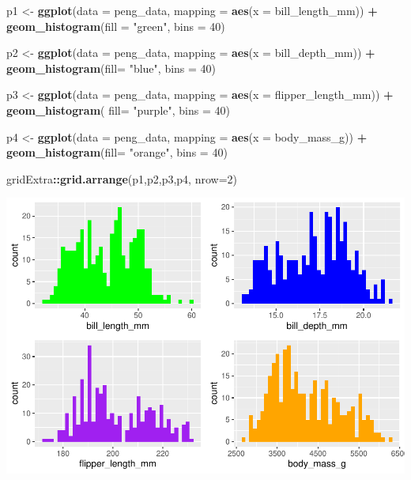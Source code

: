 \documentclass[
]{article}
\newenvironment{Shaded}{\begin{snugshade}}{\end{snugshade}}
\newcommand{\AttributeTok}[1]{\textcolor[rgb]{0.13,0.29,0.53}{#1}}
\newcommand{\DecValTok}[1]{\textcolor[rgb]{0.00,0.00,0.81}{#1}}
\newcommand{\FunctionTok}[1]{\textcolor[rgb]{0.13,0.29,0.53}{\textbf{#1}}}
\newcommand{\NormalTok}[1]{#1}
\newcommand{\OtherTok}[1]{\textcolor[rgb]{0.56,0.35,0.01}{#1}}
\newcommand{\SpecialCharTok}[1]{\textcolor[rgb]{0.81,0.36,0.00}{\textbf{#1}}}
\newcommand{\StringTok}[1]{\textcolor[rgb]{0.31,0.60,0.02}{#1}}
\begin{document}
\begin{Shaded}
\begin{Highlighting}[]
\NormalTok{p1 }\OtherTok{\textless{}{-}} \FunctionTok{ggplot}\NormalTok{(}\AttributeTok{data =}\NormalTok{ peng\_data, }\AttributeTok{mapping =} \FunctionTok{aes}\NormalTok{(}\AttributeTok{x =}\NormalTok{ bill\_length\_mm)) }\SpecialCharTok{+} 
  \FunctionTok{geom\_histogram}\NormalTok{(}\AttributeTok{fill =}  \StringTok{"green"}\NormalTok{, }\AttributeTok{bins =} \DecValTok{40}\NormalTok{)}

\NormalTok{p2 }\OtherTok{\textless{}{-}} \FunctionTok{ggplot}\NormalTok{(}\AttributeTok{data =}\NormalTok{ peng\_data, }\AttributeTok{mapping =} \FunctionTok{aes}\NormalTok{(}\AttributeTok{x =}\NormalTok{ bill\_depth\_mm)) }\SpecialCharTok{+} 
  \FunctionTok{geom\_histogram}\NormalTok{(}\AttributeTok{fill=} \StringTok{"blue"}\NormalTok{, }\AttributeTok{bins =} \DecValTok{40}\NormalTok{)}

\NormalTok{p3 }\OtherTok{\textless{}{-}} \FunctionTok{ggplot}\NormalTok{(}\AttributeTok{data =}\NormalTok{ peng\_data, }\AttributeTok{mapping =} \FunctionTok{aes}\NormalTok{(}\AttributeTok{x =}\NormalTok{ flipper\_length\_mm)) }\SpecialCharTok{+} 
  \FunctionTok{geom\_histogram}\NormalTok{( }\AttributeTok{fill=} \StringTok{"purple"}\NormalTok{, }\AttributeTok{bins =} \DecValTok{40}\NormalTok{)}

\NormalTok{p4 }\OtherTok{\textless{}{-}} \FunctionTok{ggplot}\NormalTok{(}\AttributeTok{data =}\NormalTok{ peng\_data, }\AttributeTok{mapping =} \FunctionTok{aes}\NormalTok{(}\AttributeTok{x =}\NormalTok{ body\_mass\_g)) }\SpecialCharTok{+} 
  \FunctionTok{geom\_histogram}\NormalTok{(}\AttributeTok{fill=} \StringTok{"orange"}\NormalTok{, }\AttributeTok{bins =} \DecValTok{40}\NormalTok{)}

\NormalTok{gridExtra}\SpecialCharTok{::}\FunctionTok{grid.arrange}\NormalTok{(p1,p2,p3,p4, }\AttributeTok{nrow=}\DecValTok{2}\NormalTok{)}
\end{Highlighting}
\end{Shaded}

\includegraphics{EDA_files/figure-latex/unnamed-chunk-29-1.pdf}
\end{document}
